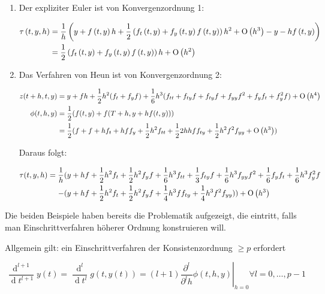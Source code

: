 \begin{example}
	\*
	\begin{enumerate}
		\item
			Der expliziter Euler ist von Konvergenzordnung 1:
			
			\begin{align*}
				\tau\left(t,y,h\right) &= \frac{1}{h} \left(y + f\left(t,y\right) h + \frac{1}{2} \left(f_t\left(t,y\right) + f_y\left(t,y\right) f\left(t,y\right)\right) h^2 + \operatorname{O}\left(h^3\right) - y - hf\left(t,y\right)\right) \\
				& = \frac{1}{2} \left(f_t\left(t,y\right) + f_y\left(t,y\right) f\left(t,y\right)\right) h + \operatorname{O}\left(h^2\right) 
			\end{align*}
			
		\item
			Das Verfahren von Heun ist von Konvergenzordnung 2:
			
			\begin{align*}
				z(t+h,t,y) &= y+f h + \frac{1}{2} h^2 (f_t + f_yf) + \frac{1}{6} h^3(f_{tt} + f_{ty}f + f_{ty} f + f_{yy}f^2 + f_yf_t + f_y^2 f) + \operatorname{O}\left(h^4\right) \\
				\phi(t,h,y) &= \frac{1}{2} ( f(t,y) + f(T+h, y+hf(t,y))) \\
				&= \frac{1}{2} (f + f + hf_t + h f f_y + \frac{1}{2} h^2 f_{tt} + \frac{1}{2} 2 h h f f_{ty} + \frac{1}{2} h^2 f^2 f_{yy} + \operatorname{O}\left(h^3\right))
			\end{align*}
			
			Daraus folgt:
			
			\begin{align*}
				\tau(t,y,h) = \frac{1}{h} &(y + hf + \frac{1}{2} h^2 f_t + \frac{1}{2} h^2 f_yf + \frac{1}{6} h^3 f_{tt} + \frac{1}{3} f_{ty}f + \frac{1}{6} h^3 f_{yy} f^2 + \frac{1}{6} f_yf_t + \frac{1}{6} h^3 f_y^2 f \\
				- &(y + hf + \frac{1}{2} h^2 f_t + \frac{1}{2} h^2 f_yf + \frac{1}{4} h^3 ff_{ty} + \frac{1}{4} h^3 f^2f_{yy})) + \operatorname{O}\left(h^3\right)
			\end{align*}
	\end{enumerate}
\end{example}

Die beiden Beispiele haben bereits die Problematik aufgezeigt, die eintritt, falls man Einschrittverfahren höherer Ordnung konstruieren will. 

Allgemein gilt: ein Einschrittverfahren der Konsistenzordnung $\ge p$ erfordert 

$$\frac{\operatorname{d}^{l+1}}{\operatorname{d}t^{l+1}} y(t) = \frac{\operatorname{d}^{l}}{\operatorname{d}t^{l}} g(t,y(t)) = \left. (l+1) \frac{\partial^l}{\partial^l h} \phi (t,h,y) \right|_{h = 0} \forall l=0, \dots, p-1$$ 

